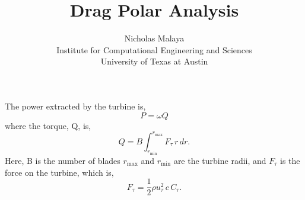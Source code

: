\documentclass{article}
\title{\bf{Drag Polar Analysis}}
\author{Nicholas Malaya \\ Institute for Computational Engineering and Sciences \\ University of Texas at Austin} \date{}
\begin{document}
\maketitle

\newpage

The power extracted by the turbine is, 
\begin{equation}
 P = \omega Q
\end{equation}
where the torque, Q, is, 
\begin{equation}
 Q = B \int_{r_{\text{min}}}^{r_{\text{max}}} F_{\tau}\, r\, dr.
\end{equation}
Here, B is the number of blades $r_{\text{max}}$ and $r_{\text{min}}$
are the turbine radii, and $F_{\tau}$ is the force on the turbine, which
is, 
\begin{equation}
 F_{\tau} = \frac{1}{2}\rho u_{\tau}^2 \, c \, C_{\tau}.
\end{equation}
\end{document}
